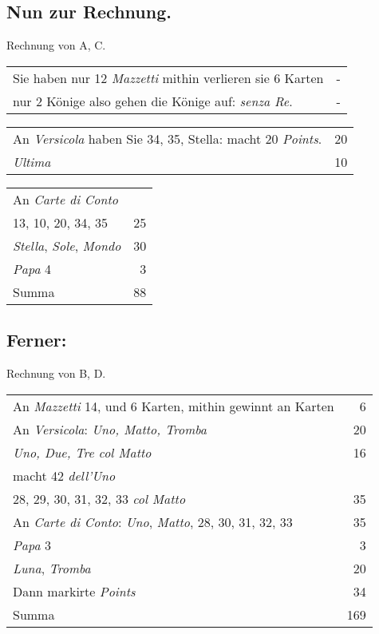 \documentclass[11pt,a6paper,twoside]{article}
\begin{document}
\subsection{Nun zur Rechnung.}

Rechnung von A, C.\\
\begin{tabular}{@{}b{6.5cm}@{\hspace{2em}}r}
Sie haben nur 12 \textit{Mazzetti} mithin verlieren sie 6 Karten&-\\
nur 2 Könige also gehen die Könige auf: \textit{senza Re}.&-\\
\end{tabular}
\begin{tabular}{@{}b{6.5cm}r}
An \textit{Versicola} haben Sie
34, 35, Stella: macht 20 \textit{Points}.& 20\\
\textit{Ultima}& 10\\
\end{tabular}
\begin{tabular}{@{}b{6.5cm}r}
An \textit{Carte di Conto}\\
13, 10, 20, 34, 35& 25\\
\textit{Stella}, \textit{Sole}, \textit{Mondo} & 30\\
\textit{Papa} 4 &3 \\
Summa &88
\end{tabular}

\subsection{Ferner:}

Rechnung von B, D.\\
\begin{tabular}{@{}b{6.5cm}r}
An \textit{Mazzetti} 14, und 6 Karten,
mithin gewinnt an Karten & 6\\
An \textit{Versicola}:
\textit{Uno, Matto, Tromba}& 20\\
\textit{Uno, Due, Tre col Matto}& 16\\
macht 42 \textit{dell'Uno}\\
28, 29, 30, 31, 32, 33 \textit{col Matto}& 35\\
An \textit{Carte di Conto}:
\textit{Uno}, \textit{Matto}, 28, 30, 31, 32, 33& 35\\
\textit{Papa} 3& 3\\
\textit{Luna}, \textit{Tromba}& 20\\
Dann markirte \textit{Points}& 34\\
Summa& 169
\end{tabular}
\end{document}
